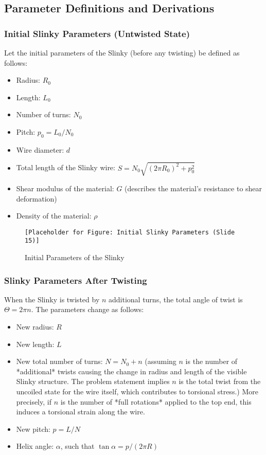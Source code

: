 \documentclass{mcmthesis}  %
\begin{document}
\subsection{Parameter Definitions and Derivations}

\subsubsection{Initial Slinky Parameters (Untwisted State)}
Let the initial parameters of the Slinky (before any twisting) be defined as follows:
\begin{itemize}
    \item Radius: \(R_0\)
    \item Length: \(L_0\)
    \item Number of turns: \(N_0\)
    \item Pitch: \(p_0 = L_0 / N_0\)
    \item Wire diameter: \(d\)
    \item Total length of the Slinky wire: \(S = N_0 \sqrt{(2\pi R_0)^2 + p_0^2}\)
    \item Shear modulus of the material: \(G\) (describes the material's resistance to shear deformation)
    \item Density of the material: \(\rho\)
\end{itemize}

\begin{figure}[h!]
    \centering
    \texttt{[Placeholder for Figure: Initial Slinky Parameters (Slide 15)]}
    \caption{Initial Parameters of the Slinky}
    \label{fig:initial_params}
\end{figure}

\subsubsection{Slinky Parameters After Twisting}
When the Slinky is twisted by \(n\) additional turns, the total angle of twist is \(\Theta = 2\pi n\). The parameters change as follows:
\begin{itemize}
    \item New radius: \(R\)
    \item New length: \(L\)
    \item New total number of turns: \(N = N_0 + n\) (assuming \(n\) is the number of *additional* twists causing the change in radius and length of the visible Slinky structure. The problem statement implies \(n\) is the total twist from the uncoiled state for the wire itself, which contributes to torsional stress.) More precisely, if \(n\) is the number of *full rotations* applied to the top end, this induces a torsional strain along the wire.
    \item New pitch: \(p = L / N\)
    \item Helix angle: \(\alpha\), such that \(\tan \alpha = p / (2\pi R)\)
\end{itemize}
\end{document}
